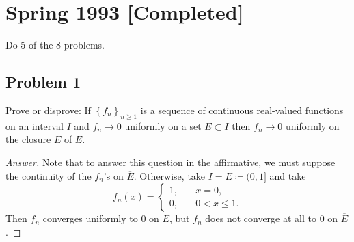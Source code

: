 \documentclass[12pt]{article}
\newcommand\setb[1]{\left \{ #1 \right \}}
\theoremstyle{definition}
\begin{document}
\section{Spring 1993 [Completed]}
Do 5 of the 8 problems.
\subsection{Problem 1 \texorpdfstring{\cite{copper.hat}}{}}
Prove or disprove: If $\setb{ f_n }_{n \geq 1}$ is a sequence of continuous real-valued functions on an interval $I$ and $f_n \to 0$ uniformly on a set $E \subset I$ then $f_n \to 0$ uniformly on the closure $\overline{E}$ of $E$.
\begin{proof}[Answer]
    Note that to answer this question in the affirmative, we must suppose the continuity of the $f_n$'s on $\overline{E}$. Otherwise, take $I = E \coloneqq (0,1]$ and take 
    \[
        f_n(x) = 
        \begin{cases}
            1 , & \quad x = 0, \\
            0 , & \quad 0 < x \leq 1.
        \end{cases}
    \]
    Then $f_n$ converges uniformly to $0$ on $E$, but $f_n$ does not converge at all to $0$ on $\overline{E}$.
    

\end{proof}
\end{document}
